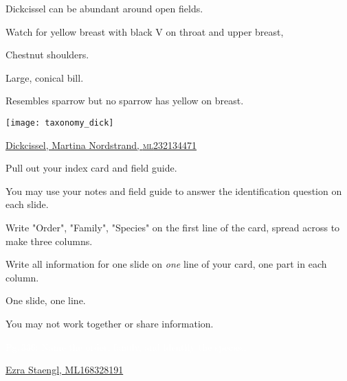 \documentclass[t]{beamer}
\newcommand{\backoneline}{\vspace{-\baselineskip}}
\begin{document}
\begin{frame}{Dickcissel can be abundant around open fields.}
	
	\backoneline
	
	\begin{multicols}{2}
		Watch for yellow breast with black V on throat and upper breast,
		
		\smallskip
		
		Chestnut shoulders.
		
		\smallskip
		
		Large, conical bill.
		
		\smallskip
		
		Resembles sparrow but no sparrow has yellow on breast.
		
		\columnbreak
		
		\texttt{[image: taxonomy\_dick]}
		
	\end{multicols}

	\tinyfill \href{https://macaulaylibrary.org/asset/232134471}{Dickcissel, Martina Nordstrand, \textsc{ml}232134471} 	
\end{frame}



\begin{frame}{Pull out your index card and field guide.}
	
	\hangpara You may use your notes and field guide to answer the identification question on each slide.

	\hangpara Write "Order", "Family", "Species" on the first line of the card, spread across to make three columns.
	
	\hangpara Write all information for one slide on \textit{one} line of your card, one part in each column.
	
	\hangpara One slide, one line.
	
	\hangpara You may not work together or share information.
	

\end{frame}


{
	\begin{frame}[t]{\textcolor{white}{Pg.\,336: Name the order, family, and identify the species.}}
		
		\tinyfill  \textcolor{white}{\href{https://macaulaylibrary.org/asset/168328191}{Ezra Staengl, ML168328191}}
	\end{frame}
}
\end{document}

